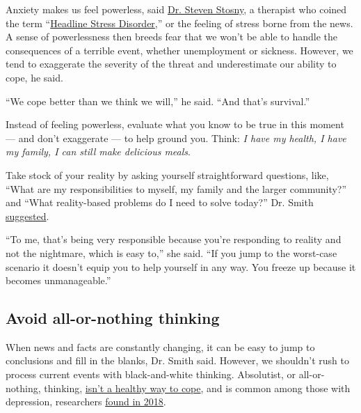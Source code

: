 Anxiety makes us feel powerless, said
\href{https://www.compassionpower.com/about-us/}{Dr. Steven Stosny}, a
therapist who coined the term
``\href{https://www.washingtonpost.com/news/inspired-life/wp/2017/02/06/suffering-from-headline-stress-disorder-since-trumps-win-youre-definitely-not-alone/?utm_term=.66411356313d\&noredirect=on}{Headline
Stress Disorder},'' or the feeling of stress borne from the news. A
sense of powerlessness then breeds fear that we won't be able to handle
the consequences of a terrible event, whether unemployment or sickness.
However, we tend to exaggerate the severity of the threat and
underestimate our ability to cope, he said.

``We cope better than we think we will,'' he said. ``And that's
survival.''

Instead of feeling powerless, evaluate what you know to be true in this
moment --- and don't exaggerate --- to help ground you. Think: \emph{I
have my health, I have my family, I can still make delicious meals}.

Take stock of your reality by asking yourself straightforward questions,
like, ``What are my responsibilities to myself, my family and the larger
community?'' and ``What reality-based problems do I need to solve
today?'' Dr. Smith
\href{https://theanxiousoverachiever.substack.com/p/20-questions-to-help-with-covid-19}{suggested}.

``To me, that's being very responsible because you're responding to
reality and not the nightmare, which is easy to,'' she said. ``If you
jump to the worst-case scenario it doesn't equip you to help yourself in
any way. You freeze up because it becomes unmanageable.''

\hypertarget{avoid-all-or-nothing-thinking}{%
\subsection{Avoid all-or-nothing
thinking}\label{avoid-all-or-nothing-thinking}}

When news and facts are constantly changing, it can be easy to jump to
conclusions and fill in the blanks, Dr. Smith said. However, we
shouldn't rush to process current events with black-and-white thinking.
Absolutist, or all-or-nothing, thinking,
\href{https://www.psychologicalscience.org/publications/observer/obsonline/all-or-nothing-thinking-more-common-in-people-with-anxiety-depression-and-suicidal-ideation.html}{isn't
a healthy way to cope}, and is common among those with depression,
researchers
\href{https://journals.sagepub.com/doi/full/10.1177/2167702617747074}{found
in 2018}.

